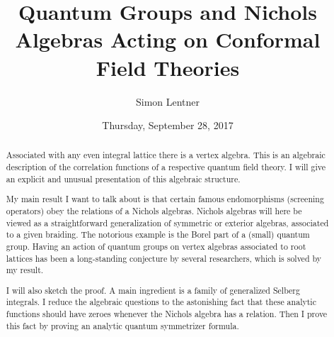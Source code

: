 \documentclass{UAmathtalk}
\author{Simon Lentner}
\title{Quantum Groups and Nichols Algebras Acting on Conformal Field Theories}
\date{Thursday, September 28, 2017}
\begin{document}
\maketitle

\begin{abstract}
Associated with any even integral lattice there is a vertex algebra. This is an algebraic description of the correlation functions of a respective quantum field theory. I will give an explicit and unusual presentation of this algebraic structure.

My main result I want to talk about is that certain famous endomorphisms (screening operators) obey the relations of a Nichols algebras. Nichols algebras will here be viewed as a straightforward generalization of symmetric or exterior algebras, associated to a given braiding. The notorious example is the Borel part of a (small) quantum group. Having an action of quantum groups on vertex algebras associated to root lattices has been a long-standing conjecture by several researchers, which is solved by my result.

I will also sketch the proof. A main ingredient is a family of generalized Selberg integrals. I reduce the algebraic questions to the astonishing fact that these analytic functions should have zeroes whenever the Nichols algebra has a relation. Then I prove this fact by proving an analytic quantum symmetrizer formula.
\end{abstract}
\end{document}
